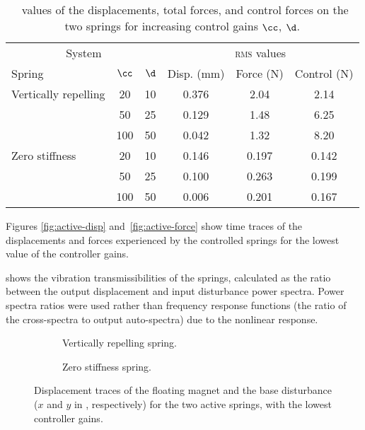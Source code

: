 \begin{table}
  \caption{\RMS\ values of the displacements, total forces, and control
  forces on the two springs for increasing control gains $\cc$, $\d$.}
  \begin{tabular}{@{} lccccc @{}}
    \toprule
    \multicolumn{3}{c}{System} & \multicolumn{3}{c}{\textsc{rms} values} \\
    \cmidrule(r){1-3}  \cmidrule(l){4-6}
    Spring & $\cc$ & $\d$ & Disp. (mm) & Force (N) & Control (N) \\
    \midrule
    Vertically repelling & 20  & 10  & 0.376  & 2.04  & 2.14  \\
                         & 50  & 25  & 0.129  & 1.48  & 6.25  \\
                         & 100 & 50  & 0.042  & 1.32  & 8.20  \\
    \midrule
    Zero stiffness       & 20  & 10  & 0.146 & 0.197 & 0.142 \\
                         & 50  & 25  & 0.100 & 0.263 & 0.199 \\
                         & 100 & 50  & 0.006 & 0.201 & 0.167 \\
    \bottomrule
  \end{tabular}
\end{table}

Figures \ref{fig:active-disp} and~\ref{fig:active-force}
show time traces of the displacements and forces experienced by the
controlled springs for the lowest value of the controller gains.

 shows the vibration transmissibilities of the
springs, calculated as the ratio between the output displacement and
input disturbance power spectra. Power spectra ratios were used
rather than frequency response functions (the ratio of the
cross-spectra to output auto-spectra) due to the nonlinear
response.

\begin{figure}
\begin{wide}
  \begin{subfigure}
    \caption{Vertically repelling spring.}
  \end{subfigure}
  \hfill
  \begin{subfigure}
    \caption{Zero stiffness spring.}
     \end{subfigure}
  \end{wide}
  \caption{Displacement traces of the floating magnet and the base
      disturbance ($x$ and $y$ in ,
      respectively) for the two active springs, with the lowest
      controller gains.}
\end{figure}

